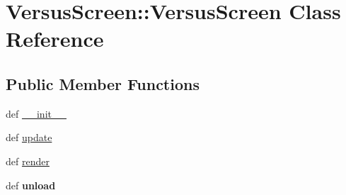 \hypertarget{class_versus_screen_1_1_versus_screen}{
\section{VersusScreen::VersusScreen Class Reference}
\label{class_versus_screen_1_1_versus_screen}
}
\subsection*{Public Member Functions}
\begin{CompactItemize}
\item 
def \hyperlink{class_versus_screen_1_1_versus_screen_225cac261f3a0a756cfea28cb4153c6d}{\_\-\_\-init\_\-\_\-}
\item 
def \hyperlink{class_versus_screen_1_1_versus_screen_9a1411490a4e57b8a7d2003d12acea23}{update}
\item 
def \hyperlink{class_versus_screen_1_1_versus_screen_48a656b39ea261b62a4d0834498d24eb}{render}
\item 
\hypertarget{class_versus_screen_1_1_versus_screen_cb01c5fe0bc8c7120caf33b85c6df262}{
def \textbf{unload}}
\label{class_versus_screen_1_1_versus_screen_cb01c5fe0bc8c7120caf33b85c6df262}

\end{CompactItemize}
